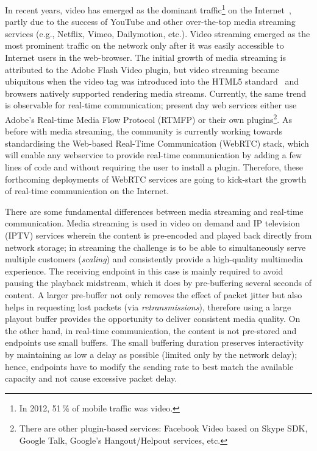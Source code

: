 In recent years, video has emerged as the dominant traffic\footnote{In 2012,
51\,\% of mobile traffic was video.} on the Internet~\cite{cvni.13,dawn.zb},
partly due to the success of YouTube and other over-the-top media streaming
services (e.g., Netflix, Vimeo, Dailymotion, etc.). Video streaming emerged as
the most prominent traffic on the network only after it was easily accessible
to Internet users in the web-browser. The initial growth of media streaming
is attributed to the Adobe Flash Video plugin, but video streaming became ubiquitous when
the video tag was introduced into the HTML5 standard~\cite{html5-spec} and
browsers natively supported rendering media streams. Currently, the same trend
is observable for real-time communication; present day web services either use
Adobe's Real-time Media Flow Protocol (RTMFP) \cite{RFC7016} or
their own plugins\footnote{There are other plugin-based services: Facebook
Video based on Skype SDK, Google Talk, Google's Hangout/Helpout services,
etc.}. As before with media streaming, the community is currently working
towards standardising the Web-based Real-Time Communication (WebRTC) stack,
which will enable any webservice to provide real-time communication by adding
a few lines of code and without requiring the user to install a plugin.
Therefore, these forthcoming deployments of WebRTC services are going to
kick-start the growth of real-time communication on the Internet.


There are some fundamental differences between media streaming and real-time
communication. Media streaming is used in video on demand and IP television
(IPTV) services wherein the content is pre-encoded and played back directly
from network storage; in streaming the challenge is to be able to simultaneously serve
multiple customers (\emph{scaling}) and consistently provide a high-quality
multimedia experience. The receiving endpoint in this case is mainly required
to avoid pausing the playback midstream, which it does by pre-buffering
several seconds of content. A larger pre-buffer not only removes the effect of
packet jitter but also helps in requesting lost packets (via
\emph{retransmissions}), therefore using a large playout buffer provides the
opportunity to deliver consistent media quality.
On the other hand, in real-time communication, the content is not pre-stored
and endpoints use small buffers. The small buffering duration preserves
interactivity by maintaining as low a delay as possible (limited only by the
network delay); hence, endpoints have to modify the sending rate to best match the
available capacity and not cause excessive packet delay. 

